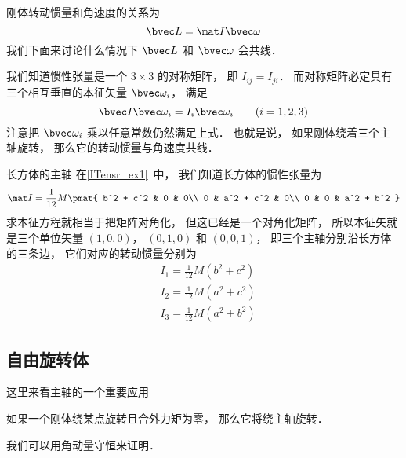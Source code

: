 
\begin{issues}
\issueDraft
\end{issues}


刚体转动惯量和角速度的关系为
\begin{equation}
\bvec L = \mat I \bvec \omega
\end{equation}
我们下面来讨论什么情况下 $\bvec L$ 和 $\bvec \omega$ 会共线．

我们知道惯性张量是一个 $3\times 3$ 的对称矩阵， 即 $I_{ij} = I_{ji}$． 而对称矩阵必定具有三个相互垂直的本征矢量 $\bvec \omega_i$， 满足
\begin{equation}
\bvec I \bvec \omega_i = I_i \bvec \omega_i \qquad (i = 1,2,3)
\end{equation}
注意把 $\bvec \omega_i$ 乘以任意常数仍然满足上式． 也就是说， 如果刚体绕着三个主轴旋转， 那么它的转动惯量与角速度共线．

\begin{example}{长方体的主轴}
在\autoref{ITensr_ex1}~中， 我们知道长方体的惯性张量为
\begin{equation}
\mat I = \frac{1}{12} M
\pmat{
   b^2 + c^2 & 0 & 0\\
   0 & a^2 + c^2 & 0\\
   0 & 0 & a^2 + b^2
}
\end{equation}
求本征方程就相当于把矩阵对角化， 但这已经是一个对角化矩阵， 所以本征矢就是三个单位矢量 $(1,0,0)$， $(0,1,0)$ 和 $(0,0,1)$， 即三个主轴分别沿长方体的三条边， 它们对应的转动惯量分别为
\begin{equation}
\begin{aligned}
&I_1 = \frac{1}{12}M(b^2+c^2)\\
&I_2 = \frac{1}{12}M(a^2+c^2)\\
&I_3 = \frac{1}{12}M(a^2+b^2)
\end{aligned}
\end{equation}
\end{example}

\subsection{自由旋转体}
这里来看主轴的一个重要应用
\begin{theorem}{}
如果一个刚体绕某点旋转且合外力矩为零， 那么它将绕主轴旋转．
\end{theorem}
我们可以用角动量守恒来证明．

